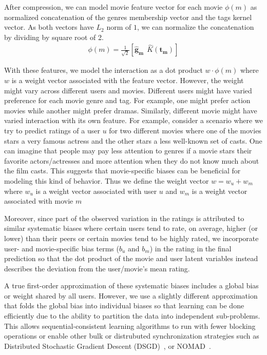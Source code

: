 \documentclass{article} %
\newcommand{\kernel}{K}
\begin{document}
After compression, we can model movie feature vector for each movie $\phi(m)$ as normalized concatenation of the genres membership vector and the tags kernel vector. As both vectors have $L_2$ norm of $1$, we can normalize the concatenation by dividing by square root of 2.
\begin{align}
	\phi(m) = \frac{1}{\sqrt{2}} [\bm{\hat{g}_m}\ \ \hat{\kernel}(\bm{t_m})]
\end{align}

With these features, we model the interaction as a dot product $w \cdot
\phi(m)$ where $w$ is a weight vector associated with the feature vector.
However, the weight might vary across different users and movies. Different
users might have varied preference for each movie genre and tag. For
example, one might prefer action movies while another might prefer dramas.
Similarly, different movie might have varied interaction with its own
feature. For example, consider a scenario where we try to predict ratings of
a user $u$ for two different movies where one of the movies stars a very
famous actress and the other stars a less well-known set of casts. One can
imagine that people may pay less attention to genres if a movie stars their
favorite actors/actresses and more attention when they do not know much
about the film casts. This suggests that movie-specific biases can be
beneficial for modeling this kind of behavior.  Thus we define the weight
vector $w = w_u + w_m$ where $w_u$ is a weight vector associated with user
$u$ and  $w_m$ is a weight vector associated with movie $m$

Moreover, since part of the observed variation in the ratings is attributed
to similar systematic biases \cite{koren:matrix} where certain users tend to
rate, on average, higher (or lower) than their peers or certain movies tend
to be highly rated, we incorporate user- and movie-specific bias terms
($b_u$ and $b_m$) in the rating in the final prediction so that the dot
product of the movie and user latent variables instead describes the
deviation from the user/movie's mean rating.

A true first-order approximation of these systematic biases includes a
global bias or weight shared by all users. However, we use a slightly
different approximation that folds the global bias into individual biases so
that learning can be done efficiently due to the ability to  partition the
data into independent sub-problems. This allows sequential-consistent
learning algorithms to run with fewer blocking operations or enable other
bulk or distrubuted synchronization strategies such as Distributed
Stochastic Gradient Descent (DSGD)~\cite{gemulla2011large}, or
NOMAD~\cite{yun2013nomad}.
\end{document}
